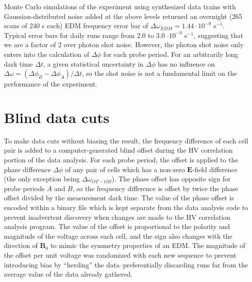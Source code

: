 \documentclass [10pt, twoside] {uwthesis}[2012/04/02]
\begin{document}
Monte Carlo simulations of the experiment using synthesized data trains with Gaussian-distributed noise added at the above levels returned an overnight (265 scans of 240 s each) EDM frequency error bar of $\Delta \omega_{EDM} = 1.44 \cdot 10^{-9}$ s$^{-1}$. Typical error bars for daily runs range from 2.0 to 3.0 $\cdot 10^{-9}$ s$^{-1}$, suggesting that we are a factor of 2 over photon shot noise.  However, the photon shot noise only enters into the calculation of $\Delta\phi$ for each probe period. For an arbitrarily long dark time $\Delta t$, a given statistical uncertainty in $\Delta\phi$ has no influence on $\Delta\omega = (\Delta\phi_B - \Delta\phi_A)/\Delta t$, so the shot noise is not a fundamental limit on the performance of the experiment.

\section{Blind data cuts}
To make data cuts without biasing the result, the frequency difference of each cell pair is added to a computer-generated blind offset during the HV correlation portion of the data analysis. For each probe period, the offset is applied to the phase difference $\Delta\phi$ of any pair of cells which has a non-zero $\mathbf{E}$-field difference (the only exception being $\Delta\omega_{OT-OB}$). The phase offset has opposite sign for probe periods $A$ and $B$, so the frequency difference is offset by twice the phase offset divided by the measurement dark time. The value of the phase offset is encoded within a binary file which is kept separate from the data analysis code to prevent inadvertent discovery when changes are made to the HV correlation analysis program. The value of the offset is proportional to the polarity and magnitude of the voltage across each cell, and the sign also changes with the direction of $\mathbf{B}_0$ to mimic the symmetry properties of an EDM. The magnitude of the offset per unit voltage was randomized with each new sequence to prevent introducing bias by ``herding'' the data--preferentially discarding runs far from the average value of the data already gathered.
\end{document}
